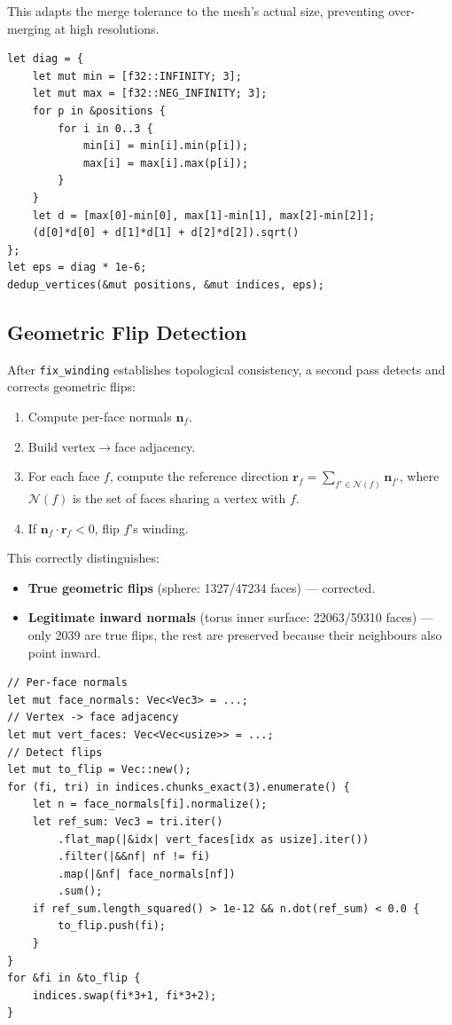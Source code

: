 \documentclass[11pt]{article}
\begin{document}
This adapts the merge tolerance to the mesh's actual size, preventing
over-merging at high resolutions.

\begin{lstlisting}
let diag = {
    let mut min = [f32::INFINITY; 3];
    let mut max = [f32::NEG_INFINITY; 3];
    for p in &positions {
        for i in 0..3 {
            min[i] = min[i].min(p[i]);
            max[i] = max[i].max(p[i]);
        }
    }
    let d = [max[0]-min[0], max[1]-min[1], max[2]-min[2]];
    (d[0]*d[0] + d[1]*d[1] + d[2]*d[2]).sqrt()
};
let eps = diag * 1e-6;
dedup_vertices(&mut positions, &mut indices, eps);
\end{lstlisting}

\subsection{Geometric Flip Detection}

After \texttt{fix\_winding} establishes topological consistency, a
second pass detects and corrects geometric flips:

\begin{enumerate}
  \item Compute per-face normals $\mathbf{n}_f$.
  \item Build vertex$\to$face adjacency.
  \item For each face $f$, compute the reference direction
        $\mathbf{r}_f = \sum_{f' \in \mathcal{N}(f)} \mathbf{n}_{f'}$,
        where $\mathcal{N}(f)$ is the set of faces sharing a vertex
        with $f$.
  \item If $\mathbf{n}_f \cdot \mathbf{r}_f < 0$, flip $f$'s winding.
\end{enumerate}

This correctly distinguishes:
\begin{itemize}
  \item \textbf{True geometric flips} (sphere: 1327/47234 faces) ---
        corrected.
  \item \textbf{Legitimate inward normals} (torus inner surface:
        22063/59310 faces) --- only 2039 are true flips, the rest
        are preserved because their neighbours also point inward.
\end{itemize}

\begin{lstlisting}
// Per-face normals
let mut face_normals: Vec<Vec3> = ...;
// Vertex -> face adjacency
let mut vert_faces: Vec<Vec<usize>> = ...;
// Detect flips
let mut to_flip = Vec::new();
for (fi, tri) in indices.chunks_exact(3).enumerate() {
    let n = face_normals[fi].normalize();
    let ref_sum: Vec3 = tri.iter()
        .flat_map(|&idx| vert_faces[idx as usize].iter())
        .filter(|&&nf| nf != fi)
        .map(|&nf| face_normals[nf])
        .sum();
    if ref_sum.length_squared() > 1e-12 && n.dot(ref_sum) < 0.0 {
        to_flip.push(fi);
    }
}
for &fi in &to_flip {
    indices.swap(fi*3+1, fi*3+2);
}
\end{lstlisting}
\end{document}
